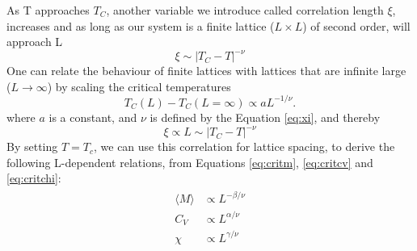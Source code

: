 \documentclass[10pt, nofootinbib, twocolumn]{revtex4-1}
\begin{document}
As T approaches $T_C$, another variable we introduce called correlation length $\xi$, increases and as long as our system is a finite lattice ($L \times L$) of second order, will approach L
\begin{equation}
    \xi  \sim |T_C - T|^{-\nu} \label{eq:xi}
\end{equation}
One can relate the behaviour of finite lattices with lattices that are infinite large ($L \longrightarrow \infty$) by scaling the critical temperatures 
\begin{equation}\label{eq:corr}
  T_C(L) - T_C(L=\infty) \propto aL^{-1/\nu}.
\end{equation}
where $a$ is a constant, and $\nu$ is defined by the Equation \eqref{eq:xi}, and thereby 
\begin{equation}
    \xi \propto L \sim |T_C - T|^{-\nu} \label{eq:xiinf}
\end{equation}
By setting $T=T_c$, we can use this correlation for lattice spacing, to derive the following L-dependent relations, from Equations \eqref{eq:critm}, \eqref{eq:critcv} and \eqref{eq:critchi}: 
\begin{align}\label{eq:relations}
    \begin{split}
        \langle M \rangle &\propto L^{-\beta/\nu} \\
        C_V &\propto L^{\alpha/\nu} \\
        \chi &\propto L^{\gamma/\nu}
    \end{split}
\end{align}
\end{document}
